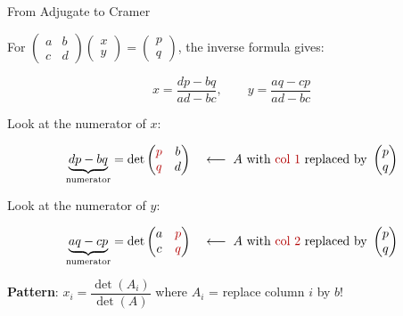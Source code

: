 \documentclass[10pt]{beamer}
\theoremstyle{definition}
\newcommand{\x}[1]{\alert{\textbf{#1}}}
\newcommand{\rd}[1]{{\color{red!70!black}#1}}
\begin{document}
\begin{frame}{From Adjugate to Cramer}

For $\begin{pmatrix}a&b\\c&d\end{pmatrix}\begin{pmatrix}x\\y\end{pmatrix} = \begin{pmatrix}p\\q\end{pmatrix}$,
the inverse formula gives:

$$x = \frac{dp - bq}{ad - bc}, \qquad y = \frac{aq - cp}{ad - bc}$$

\vfill

Look at the numerator of $x$:

$$\underbrace{dp - bq}_{\text{numerator}} = \det\begin{pmatrix}\rd{p}&b\\\rd{q}&d\end{pmatrix} \quad\longleftarrow\; A \text{ with \rd{col 1} replaced by } \begin{pmatrix}p\\q\end{pmatrix}$$

\vfill

Look at the numerator of $y$:

$$\underbrace{aq - cp}_{\text{numerator}} = \det\begin{pmatrix}a&\rd{p}\\c&\rd{q}\end{pmatrix} \quad\longleftarrow\; A \text{ with \rd{col 2} replaced by } \begin{pmatrix}p\\q\end{pmatrix}$$

\vfill

\x{Pattern}: $x_i = \dfrac{\det(A_i)}{\det(A)}$ where $A_i$ = replace column $i$ by $b$!

\end{frame}
\end{document}
